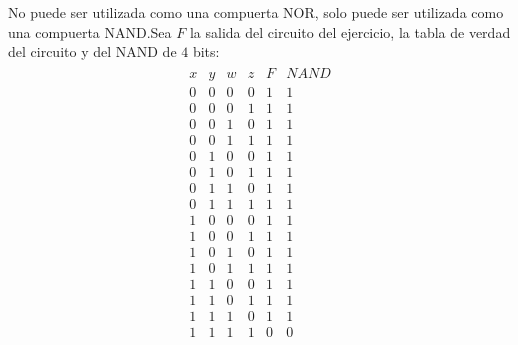 \documentclass[answers]{exam}
\begin{document}
\begin{questions}
  \begin{solution}
    No puede ser utilizada como una compuerta NOR, solo puede ser utilizada como
    una compuerta NAND.\@ Sea $F$ la salida del circuito del ejercicio, la tabla
    de verdad del circuito y del NAND de $4$ bits:
    \begin{gather*}
      \begin{array}{c|c|c|c|c|c}
        x & y & w & z & F & NAND \\
        \hline
        0 & 0 & 0 & 0 & 1 & 1 \\
        0 & 0 & 0 & 1 & 1 & 1 \\
        0 & 0 & 1 & 0 & 1 & 1 \\
        0 & 0 & 1 & 1 & 1 & 1 \\
        0 & 1 & 0 & 0 & 1 & 1 \\
        0 & 1 & 0 & 1 & 1 & 1 \\
        0 & 1 & 1 & 0 & 1 & 1 \\
        0 & 1 & 1 & 1 & 1 & 1 \\
        1 & 0 & 0 & 0 & 1 & 1 \\
        1 & 0 & 0 & 1 & 1 & 1 \\
        1 & 0 & 1 & 0 & 1 & 1 \\
        1 & 0 & 1 & 1 & 1 & 1 \\
        1 & 1 & 0 & 0 & 1 & 1 \\
        1 & 1 & 0 & 1 & 1 & 1 \\
        1 & 1 & 1 & 0 & 1 & 1 \\
        1 & 1 & 1 & 1 & 0 & 0 \\
      \end{array}
    \end{gather*}
  \end{solution}


\end{questions}
\end{document}
